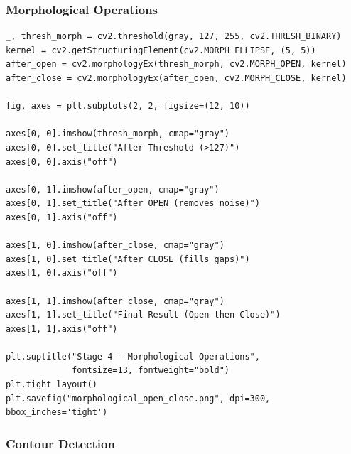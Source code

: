 \documentclass[12pt,a4paper]{article}
\begin{document}
\subsubsection{Morphological Operations}

\begin{lstlisting}
_, thresh_morph = cv2.threshold(gray, 127, 255, cv2.THRESH_BINARY)
kernel = cv2.getStructuringElement(cv2.MORPH_ELLIPSE, (5, 5))
after_open = cv2.morphologyEx(thresh_morph, cv2.MORPH_OPEN, kernel)
after_close = cv2.morphologyEx(after_open, cv2.MORPH_CLOSE, kernel)

fig, axes = plt.subplots(2, 2, figsize=(12, 10))

axes[0, 0].imshow(thresh_morph, cmap="gray")
axes[0, 0].set_title("After Threshold (>127)")
axes[0, 0].axis("off")

axes[0, 1].imshow(after_open, cmap="gray")
axes[0, 1].set_title("After OPEN (removes noise)")
axes[0, 1].axis("off")

axes[1, 0].imshow(after_close, cmap="gray")
axes[1, 0].set_title("After CLOSE (fills gaps)")
axes[1, 0].axis("off")

axes[1, 1].imshow(after_close, cmap="gray")
axes[1, 1].set_title("Final Result (Open then Close)")
axes[1, 1].axis("off")

plt.suptitle("Stage 4 - Morphological Operations", 
             fontsize=13, fontweight="bold")
plt.tight_layout()
plt.savefig("morphological_open_close.png", dpi=300, bbox_inches='tight')
\end{lstlisting}

\subsubsection{Contour Detection}
\end{document}
